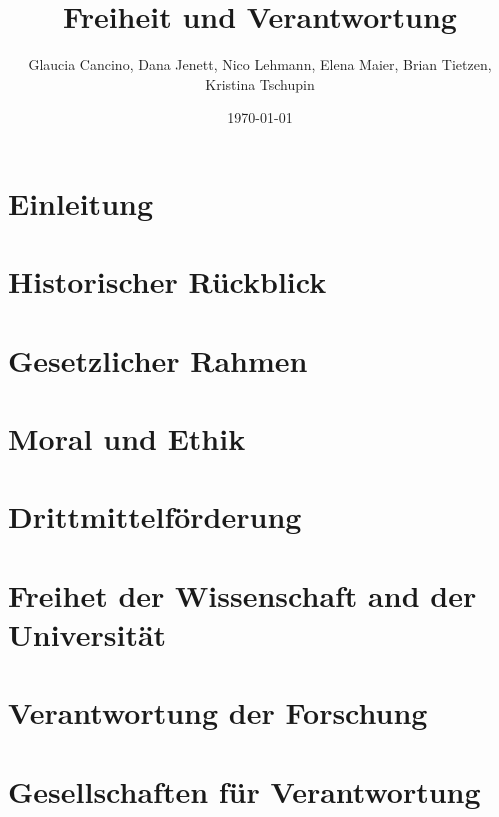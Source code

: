 \documentclass[12pt]{beamer}
\begin{document}
\title{Freiheit und Verantwortung} 
\author[]{Glaucia Cancino, Dana Jenett, Nico Lehmann, Elena Maier, Brian Tietzen, Kristina Tschupin}

\date{\today} 

\frame{\titlepage}




\section{Einleitung}


\section{Historischer Rückblick}


\section{Gesetzlicher Rahmen}


\section{Moral und Ethik}


\section{Drittmittelförderung}


\section{Freihet der Wissenschaft and der Universität}


\section{Verantwortung der Forschung}


\section{Gesellschaften für Verantwortung}

\end{document}
